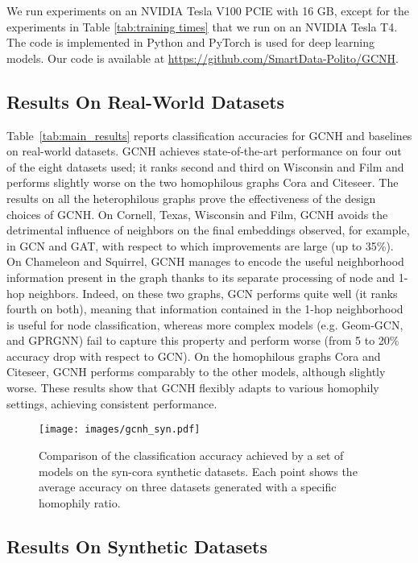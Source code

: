 \documentclass[conference]{IEEEtran}
\begin{document}
We run experiments on an NVIDIA Tesla V100 PCIE with 16 GB, except for the experiments in Table \ref{tab:training times} that we run on an NVIDIA Tesla T4. The code is implemented in Python and PyTorch is used for deep learning models. Our code is available at \url{https://github.com/SmartData-Polito/GCNH}.


\subsection{Results On Real-World Datasets}
Table~\ref{tab:main_results} reports classification accuracies for GCNH and baselines on real-world datasets. 
GCNH achieves state-of-the-art performance on four out of the eight datasets used; it ranks second and third on Wisconsin and Film and performs slightly worse on the two homophilous graphs Cora and Citeseer.
The results on all the heterophilous graphs prove the effectiveness of the design choices of GCNH. 
On Cornell, Texas, Wisconsin and Film, GCNH avoids the detrimental influence of neighbors on the final embeddings observed, for example, in GCN and GAT, with respect to which improvements are large (up to 35\%).
On Chameleon and Squirrel, GCNH manages to encode the useful neighborhood information present in the graph thanks to its separate processing of node and 1-hop neighbors. Indeed, on these two graphs, GCN performs quite well (it ranks fourth on both), meaning that information contained in the 1-hop neighborhood is useful for node classification, whereas more complex models (e.g. Geom-GCN, \htwogcn{} and GPRGNN) fail to capture this property and perform worse (from 5 to 20\% accuracy drop with respect to GCN). 
On the homophilous graphs Cora and Citeseer, GCNH performs comparably to the other models, although slightly worse. 
These results show that GCNH flexibly adapts to various homophily settings, achieving consistent performance.

\begin{figure}[t]
\centering
\texttt{[image: images/gcnh\_syn.pdf]}
\caption{Comparison of the classification accuracy achieved by a set of models on the syn-cora synthetic datasets. Each point shows the average accuracy on three datasets generated with a specific homophily ratio.}
\label{fig:gcnh_syn}
\end{figure}

\subsection{Results On Synthetic Datasets}
\end{document}
